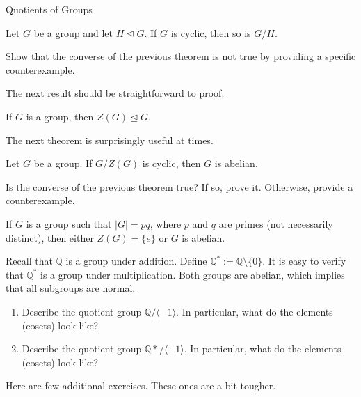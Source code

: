 \begin{section}{Quotients of Groups}
\begin{theorem}
Let $G$ be a group and let $H\trianglelefteq G$.  If $G$ is cyclic, then so is $G/H$.
\end{theorem}

\begin{problem}
Show that the converse of the previous theorem is not true by providing a specific counterexample.
\end{problem}

The next result should be straightforward to proof.

\begin{theorem}
If $G$ is a group, then $Z(G)\trianglelefteq G$.
\end{theorem}

The next theorem is surprisingly useful at times.  

\begin{theorem}
Let $G$ be a group. If $G/Z(G)$ is cyclic, then $G$ is abelian.
\end{theorem}

\begin{problem}
Is the converse of the previous theorem true?  If so, prove it.  Otherwise, provide a counterexample.
\end{problem}

\begin{theorem}
If $G$ is a group such that $|G|=pq$, where $p$ and $q$ are primes (not necessarily distinct), then either $Z(G)=\{e\}$ or $G$ is abelian.
\end{theorem}

\begin{problem}\label{prob:cosets in infinite groups}
Recall that $\mathbb{Q}$ is a group under addition. Define $\mathbb{Q}^*:=\mathbb{Q}\setminus\{0\}$. It is easy to verify that $\mathbb{Q}^*$ is a group under multiplication.  Both groups are abelian, which implies that all subgroups are normal. 
\begin{enumerate}[label=\textrm{(\alph*)}]
\item Describe the quotient group $\mathbb{Q}/\langle -1\rangle$. In particular, what do the elements (cosets) look like? 
\item Describe the quotient group $\mathbb{Q}*/\langle -1\rangle$. In particular, what do the elements (cosets) look like?
\end{enumerate}
\end{problem}

Here are few additional exercises.  These ones are a bit tougher.


\end{section}
